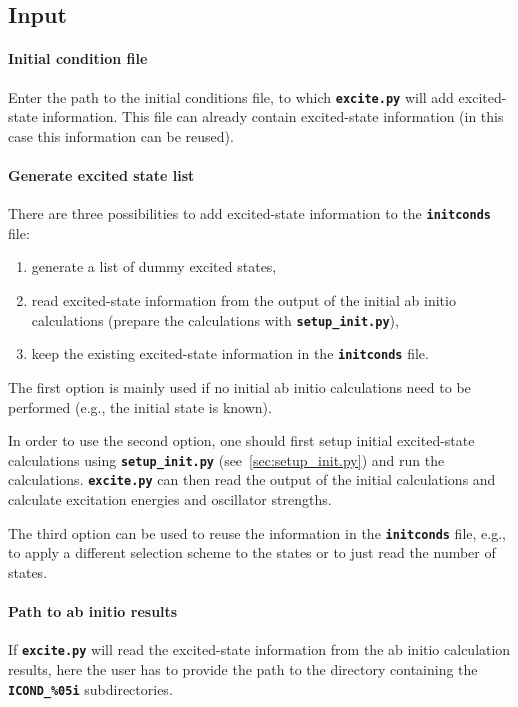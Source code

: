 \documentclass[a4paper,10pt,DIV=15,openany,twoside=false]{scrbook}
\newcommand{\ttt}[1]{\textbf{\texttt{#1}}}
\begin{document}
\subsection{Input}

\paragraph{Initial condition file}

Enter the path to the initial conditions file, to which \ttt{excite.py} will add excited-state information. This file can already contain excited-state information (in this case this information can be reused).

\paragraph{Generate excited state list}

There are three possibilities to add excited-state information to the \ttt{initconds} file:
\begin{enumerate}
  \item generate a list of dummy excited states,
  \item read excited-state information from the output of the initial ab initio calculations (prepare the calculations with \ttt{setup\_init.py}),
  \item keep the existing excited-state information in the \ttt{initconds} file.
\end{enumerate}
The first option is mainly used if no initial ab initio calculations need to be performed (e.g., the initial state is known). 

In order to use the second option, one should first setup initial excited-state calculations using \ttt{setup\_init.py} (see~\ref{sec:setup_init.py}) and run the calculations. \ttt{excite.py} can then read the output of the initial calculations and calculate excitation energies and oscillator strengths.

The third option can be used to reuse the information in the \ttt{initconds} file, e.g., to apply a different selection scheme to the states or to just read the number of states.

\paragraph{Path to ab initio results}

If \ttt{excite.py} will read the excited-state information from the ab initio calculation results, here the user has to provide the path to the directory containing the \ttt{ICOND\_\%05i} subdirectories.
\end{document}
